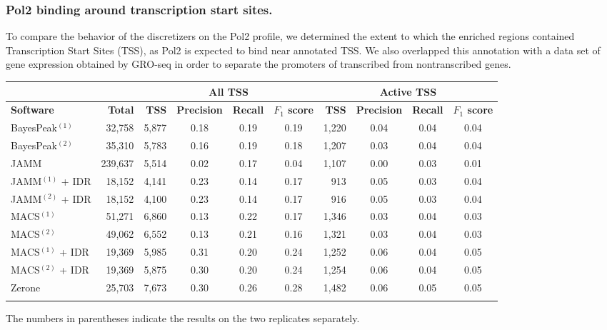 \documentclass{bioinfo}
\begin{document}
\subsubsection{Pol2 binding around transcription start sites.}
\label{subsub:pol2}
To compare the behavior of the discretizers on the Pol2 profile,
we determined the extent to which the enriched regions contained
Transcription Start Sites (TSS), as Pol2 is expected to bind near
annotated TSS. We also overlapped this annotation with a data set of
gene expression obtained by GRO-seq in order to separate the
promoters of transcribed from nontranscribed genes.

\begin{table}[!tbp]
{\begin{tabular}{lr|rccc|rccc}
        \multicolumn{2}{c}{} & \multicolumn{4}{c}{\textbf{All TSS}} & \multicolumn{4}{c}{\textbf{Active TSS}} \\
        \midrule
        \textbf{Software} & \textbf{Total} &
        \textbf{TSS} & \textbf{Precision} & \textbf{Recall} & \textbf{$F_{1}$ score} &
        \textbf{TSS} & \textbf{Precision} & \textbf{Recall} & \textbf{$F_{1}$ score} \\
        \midrule
        BayesPeak$^{(1)}$  &  32,758 & 5,877 & 0.18 & 0.19 & 0.19 & 1,220 & 0.04 & 0.04 & 0.04 \\
        BayesPeak$^{(2)}$  &  35,310 & 5,783 & 0.16 & 0.19 & 0.18 & 1,207 & 0.03 & 0.04 & 0.04 \\
        JAMM               & 239,637 & 5,514 & 0.02 & 0.17 & 0.04 & 1,107 & 0.00 & 0.03 & 0.01 \\
        JAMM$^{(1)}$ + IDR &  18,152 & 4,141 & 0.23 & 0.14 & 0.17 &   913 & 0.05 & 0.03 & 0.04 \\
        JAMM$^{(2)}$ + IDR &  18,152 & 4,100 & 0.23 & 0.14 & 0.17 &   916 & 0.05 & 0.03 & 0.04 \\
        MACS$^{(1)}$       &  51,271 & 6,860 & 0.13 & 0.22 & 0.17 & 1,346 & 0.03 & 0.04 & 0.03 \\
        MACS$^{(2)}$       &  49,062 & 6,552 & 0.13 & 0.21 & 0.16 & 1,321 & 0.03 & 0.04 & 0.03 \\
        MACS$^{(1)}$ + IDR &  19,369 & 5,985 & 0.31 & 0.20 & 0.24 & 1,252 & 0.06 & 0.04 & 0.05 \\
        MACS$^{(2)}$ + IDR &  19,369 & 5,875 & 0.30 & 0.20 & 0.24 & 1,254 & 0.06 & 0.04 & 0.05 \\
        Zerone             &  25,703 & 7,673 & 0.30 & 0.26 & 0.28 & 1,482 & 0.06 & 0.05 & 0.05 \\
        \botrule
\end{tabular}}{The numbers in parentheses indicate the results on the two
replicates separately.}
\end{table}
\end{document}
